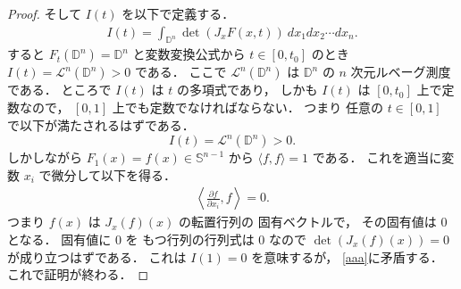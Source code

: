 \documentclass[leqno, a4paper, 12pt]{jsarticle}
\theoremstyle{plain}
\theoremstyle{definition}
\theoremstyle{remark}
\newcommand{\yospfont}[1]{\mathbb{#1}}
\newcommand{\yodisc}[1]{\yospfont{D}^{#1}}
\newcommand{\yosphere}[1]{\yospfont{S}^{#1}}
\newcommand{\yoLL}{\mathcal{L}}
\numberwithin{equation}{section}
\begin{document}
\begin{proof}
そして
$I(t)$
を以下で定義する．
\begin{align}
I(t)=\int_{\yodisc{n}}\det(J_{x}F(x, t))\ dx_{1}dx_{2}\cdots dx_{n}. 
\end{align}
すると
$F_{t}(\yodisc{n})=\yodisc{n}$
と変数変換公式から
$t\in [0, t_{0}]$
のとき
$I(t)=\yoLL^{n}(\yodisc{n})>0$
である．
ここで
$\yoLL^{n}(\yodisc{n})$
は
$\yodisc{n}$
の
$n$
次元ルベーグ測度である．
ところで
$I(t)$
は
$t$
の多項式であり，
しかも
$I(t)$
は
$[0, t_{0}]$
上で定数なので，
$[0,1]$
上でも定数でなければならない．
つまり
任意の
$t\in [0,1]$
で以下が満たされるはずである．
\begin{equation}\label{aaa}
I(t)=\yoLL^{n}(\yodisc{n})>0. 
\end{equation}
しかしながら
$F_{1}(x)=f(x)\in \yosphere{n-1}$
から
$\langle f,f\rangle =1$
である．
これを適当に変数
$x_{i}$
で微分して以下を得る．
\begin{align}
\left\langle\frac{\partial f}{\partial x_i}, f\right\rangle=0. 
\end{align}
つまり
$f(x)$
は
$J_{x}(f)(x)$
の転置行列の
固有ベクトルで，
その固有値は
$0$となる．
固有値に
$0$
を
もつ行列の行列式は
$0$
なので
$\det (J_{x}(f)(x))=0$
が成り立つはずである．
これは
$I(1)=0$
を意味するが，
\eqref{aaa}に矛盾する．
これで証明が終わる．
\end{proof}






\end{document}
